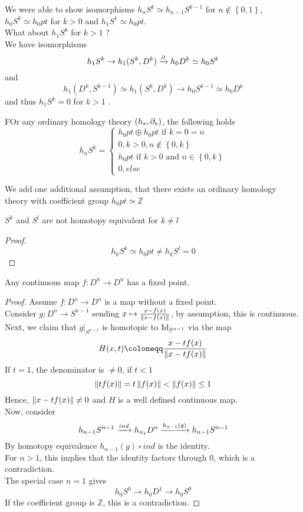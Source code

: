 \documentclass[../main.tex]{subfiles}
\begin{document}
We were able to show isomorphisms $h_n S^{k} \simeq h_{n-1} S^{k-1}$ for $n \notin \left\{ 0,1 \right\} $, $h_0 S^{k}\simeq h_0 pt$ for $k>0$ and $h_1 S^{1}\simeq h_0 pt$.\\
What about $h_1 S^{k}$ for $k>1$ ?\\
We have isomorphisms
\[ 
	h_1 S^{k}\to h_1( S^{k},D^{k}) \xrightarrow{\partial} h_0 D^{k} \simeq h_0 S^{k}
\]
and 
\[ 
h_1( D^{k},S^{k-1}) \simeq h_1( S^{k},D^{k}) \to h_0 S^{k-1}\simeq h_0 D^{k}
\]
and thus $h_1 S^{k}= 0$ for $k>1$ .\\
\begin{propo}
FOr any ordinary homology theory $( h_\ast,\partial_\ast) $, the following holds
\[ 
h_n S^{k}= 
\begin{cases}
h_0 pt \oplus h_0 pt \text{ if } k=0=n\\
0, k>0, n \notin \left\{ 0,k \right\} \\
h_0 pt \text{ if } k>0 \text{ and } n \in \left\{ 0,k \right\} \\
0, else
\end{cases}
\]
\end{propo}
We add one additional assumption, that there exists an ordinary homology theory with coefficient group $h_0 pt \simeq \mathbb{Z}$ 	
\begin{crly}
$S^{k}$ and $S^{l}$ are not homotopy equivalent for $k \neq l$ 
\end{crly}
\begin{proof}
\[ 
h_k S^{k}\simeq h_0 pt \neq h_k S^{l} = 0
\]
\end{proof}
\begin{crly}
Any continuous map $f: D^{n}\to D^{n}$ has a fixed point.
\end{crly}
\begin{proof}
Assume $f: D^{n}\to D^{n}$ is a map without a fixed point.\\
Consider $g: D^{n}\to S^{n-1}$ sending $ x\mapsto \frac{x- f( x) }{\left\lVert x- f( x) \right\rVert }$, by assumption, this is continuous.\\
Next, we claim that $g|_{S^{n-1}} $ is homotopic to $\operatorname{Id}_{S^{n-1}} $ via the map
\[ 
H( x,t) \coloneqq \frac{x- t f( x) }{\N { x-t f( x) } }
\]
If $t=1$, the denominator is $\neq 0$, if $t<1$ 
\[ 
	\left\lVert t f( x) \right\rVert = t \left\lVert f( x) \right\rVert < \left\lVert f( x) \right\rVert \leq 1
\]
Hence, $\left\lVert x- t f( x) \right\rVert \neq 0$ and $H$ is a well defined continuous map.\\
Now, consider
\[ 
	h_{n-1} S^{n-1}\xrightarrow{ind} h_{n_1} D^{n}\xrightarrow{h_{n-1} ( g) } h_{n-1} S^{n-1}
\]
By homotopy equivalence $h_{n-1 } ( g) \circ ind$ is the identity.\\
For $n>1$, this implies that the identity factors through 0, which is a contradiction.\\
The special case $n=1$ gives
\[ 
h_0 S^{0}\to h_0 D^{1}\to h_0 S^{0}
\]
If the coefficient group is $\mathbb{Z}$, this is a contradiction.
\end{proof}
\end{document}
